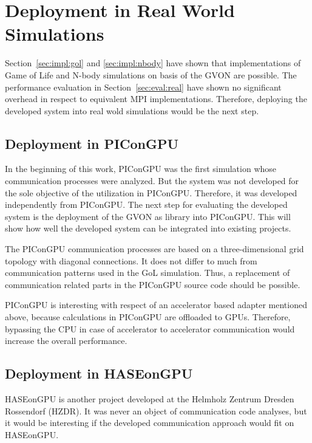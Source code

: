 \section*{Deployment in Real World Simulations}

Section~\ref{sec:impl:gol} and \ref{sec:impl:nbody} have shown that
implementations of Game of Life and N-body simulations on basis of the
GVON are possible. The performance evaluation in
Section~\ref{sec:eval:real} have shown no significant overhead in
respect to equivalent MPI implementations. Therefore, deploying the
developed system into real wold simulations would be the next step.

\subsection*{Deployment in PIConGPU}
In the beginning of this work, PIConGPU was the first simulation whose
communication processes were analyzed. But the system was not
developed for the sole objective of the utilization in
PIConGPU. Therefore, it was developed independently from PIConGPU.
The next step for evaluating the developed system is the deployment of
the GVON as library into PIConGPU. This will show how well the
developed system can be integrated into existing projects.

The PIConGPU communication processes are based on a three-dimensional
grid topology with diagonal connections. It does not differ to much
from communication patterns used in the GoL simulation. Thus, a
replacement of communication related parts in the PIConGPU source code
should be possible.

PIConGPU is interesting with respect of an accelerator based adapter
mentioned above, because calculations in PIConGPU are offloaded to
GPUs. Therefore, bypassing the CPU in case of accelerator to
accelerator communication would increase the overall performance.

\subsection*{Deployment in HASEonGPU}
HASEonGPU is another project developed at the Helmholz Zentrum
Dresden Rossendorf (HZDR).  It was never an object of communication code
analyses, but it would be interesting if the developed communication
approach would fit on HASEonGPU.

